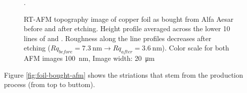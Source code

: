 	\begin{figure}\centering
		 \quad
		 \quad
		\caption{RT-AFM topography image of copper foil as bought from Alfa Aesar  before and  after etching.  Height profile averaged across the lower 10 lines of  and . Roughness along the line profiles decreases after etching ($Rq_{before}=\SI{7.3}{\nano \meter} \rightarrow Rq_{after}=\SI{3.6}{\nano \meter}$). Color scale for both AFM images \SI{100}{\nano \meter}, Image width: \SI{20}{\micro \meter}}.
		\label{fig:foil-afm-as-bought}
	\end{figure}
	
	Figure \ref{fig:foil-bought-afm} shows the striations that stem from the production process (from top to buttom).
	
